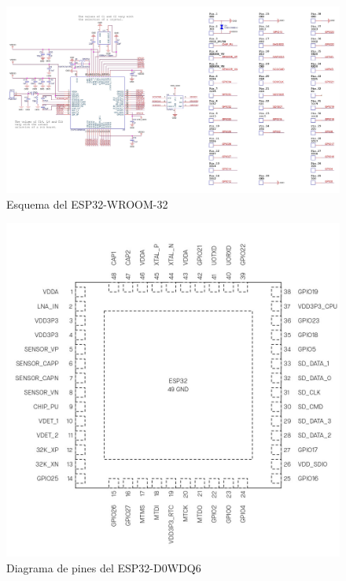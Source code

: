 \documentclass[../main]{subfiles}
\begin{document}
\begin{landscape}
	\begin{figure}[H]
		\centering
		\includegraphics[height=0.85\textheight]{res/esp32-wroom-32_diagram.jpg}
		\caption{Esquema del ESP32-WROOM-32 \supercite{esp32wroom32doc}}
		\label{esp32wroom32esq}
	\end{figure}
\end{landscape}

\begin{figure}[H]
	\centering
	\includegraphics[width=\textwidth]{res/esp32_datasheet_en_page-0013.jpg}
	\caption{Diagrama de pines del ESP32-D0WDQ6 \supercite{esp32d0wdq62doc}}
	\label{fig:esp32d0wdq62pines}
\end{figure}
\end{document}
